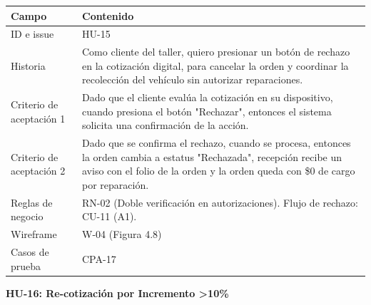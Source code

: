 {\def\LTcaptype{none} %
\begin{longtable}[]{@{}
  >{\raggedright\arraybackslash}p{}
  >{\raggedright\arraybackslash}p{}@{}}
\toprule\noalign{}
\begin{minipage}[b]{\linewidth}\raggedright
\textbf{Campo}
\end{minipage} & \begin{minipage}[b]{\linewidth}\raggedright
\textbf{Contenido}
\end{minipage} \\
\midrule\noalign{}
\endhead
\bottomrule\noalign{}
\endlastfoot
ID e issue & HU-15 \\
Historia & Como cliente del taller, quiero presionar un botón de rechazo
en la cotización digital, para cancelar la orden y coordinar la
recolección del vehículo sin autorizar reparaciones. \\
Criterio de aceptación 1 & Dado que el cliente evalúa la cotización en
su dispositivo, cuando presiona el botón "Rechazar", entonces el sistema
solicita una confirmación de la acción. \\
Criterio de aceptación 2 & Dado que se confirma el rechazo, cuando se
procesa, entonces la orden cambia a estatus "Rechazada", recepción
recibe un aviso con el folio de la orden y la orden queda con \$0 de
cargo por reparación. \\
Reglas de negocio & RN-02 (Doble verificación en autorizaciones). Flujo
de rechazo: CU-11 (A1). \\
Wireframe & W-04 (Figura 4.8) \\
Casos de prueba & CPA-17 \\
\end{longtable}
}

\textbf{HU-16: Re-cotización por Incremento \textgreater10\%}

